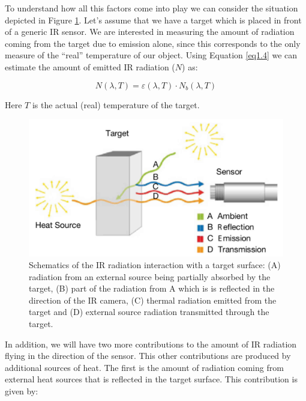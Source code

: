 		To understand how all this factors come into play we can consider the situation depicted in Figure \ref{fig1.6}.  Let's assume that we have a target which is placed in front of a generic IR sensor. We are interested in measuring the amount of radiation coming from the target due to emission alone, since this corresponds to the only measure of the “real” temperature of our object. Using Equation \ref{eq1.4} we can estimate the amount of emitted IR radiation ($N$) as: 
		
		\begin{equation}\label{eq1.8}
			N(\lambda,T)=\varepsilon(\lambda,T) \cdot N_{b}(\lambda, T)
		\end{equation}\bigskip
		
		Here $T$ is the actual (real) temperature of the target.
			
		\begin{figure}[ht!]
			\centering
			\captionsetup{justification=centering,margin=2cm}
			\includegraphics[scale=0.38]{Figures/Chapter01/SchematicsOfIRRadiation.jpg}
			\caption{Schematics of the IR radiation interaction with a target surface: (A) radiation from an external source being partially absorbed by the target, (B) part of the radiation from A which is is reflected in the direction of the IR camera, (C) thermal  radiation emitted from the target and (D) external source radiation transmitted through the target.}\label{fig1.6}
		\end{figure}
		
		In addition, we will have two more contributions to the amount of IR radiation flying in the direction of the sensor. This other contributions are produced by additional sources of heat. The first is the amount of radiation coming from external heat sources that is reflected in the target surface. This contribution is given by:
		
